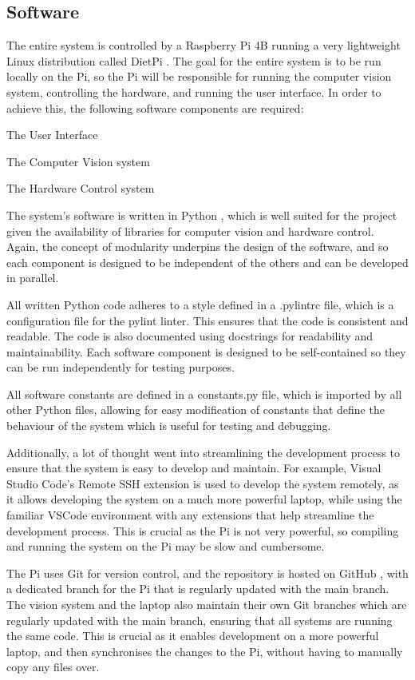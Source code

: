 \subsection{Software}
The entire system is controlled by a Raspberry Pi 4B running a very lightweight Linux distribution called DietPi \cite{dietpi}.
The goal for the entire system is to be run locally on the Pi, so the Pi will be responsible for running the computer vision system,
controlling the hardware, and running the user interface. In order to achieve this, the following software components are required:
\begin{mylist}
  \item The User Interface
  \item The Computer Vision system
  \item The Hardware Control system
\end{mylist}
\noindent
The system's software is written in Python \cite{python}, which is well suited for the project given the 
availability of libraries for computer vision and hardware control. Again, the concept of modularity underpins the design of the software,
and so each component is designed to be independent of the others and can be developed in parallel.

All written Python code adheres to a style defined in a .pylintrc file, which is a configuration file for the pylint \cite{pylint} linter. This ensures
that the code is consistent and readable. The code is also documented using docstrings for 
readability and maintainability. Each software component is designed to be self-contained so they can be run independently for testing purposes.

All software constants are defined in a constants.py file, which is imported by all other Python files, allowing for easy modification of constants
that define the behaviour of the system which is useful for testing and debugging.

Additionally, a lot of thought went into streamlining the development process to ensure that the system is easy to develop and maintain. For example,
Visual Studio Code's \cite{vscode} Remote SSH extension is used to develop the system remotely, as it allows developing the system on a much more powerful laptop, while
using the familiar VSCode environment with any extensions that help streamline the development process. This is crucial as the Pi is not very powerful, so
compiling and running the system on the Pi may be slow and cumbersome.

The Pi uses Git \cite{git} for version control, and the repository is hosted on GitHub \cite{github}, with a dedicated branch for the Pi that is regularly
updated with the main branch. The vision system and the laptop also maintain their own Git branches which are regularly updated with the main branch, ensuring 
that all systems are running the same code. This is crucial as it enables development on a more powerful laptop, and then synchronises the changes to the Pi, without
having to manually copy any files over.


